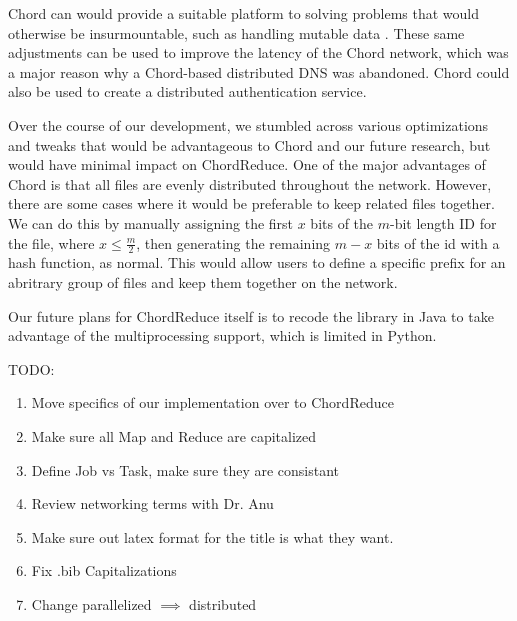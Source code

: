 \documentclass[conference, compsocconf, letterpaper]{IEEEtran}
\begin{document}
Chord can would provide a suitable platform to solving problems that would otherwise be insurmountable, such as handling mutable data \cite{IRM}.  These same adjustments can be used to improve the latency of the Chord network, which was a major reason why a Chord-based distributed DNS \cite{cox2002serving} was abandoned.  Chord could also be used to create a distributed authentication service.

Over the course of our development, we stumbled across various optimizations and tweaks that would be advantageous to Chord and our future research, but would have minimal impact on ChordReduce.  One of the major advantages of Chord is that all files are evenly distributed throughout the network.  However, there are some cases where it would be preferable to keep related files together.  We can do this by manually assigning the first $x$ bits of the $m$-bit length ID for the file, where $x \leq \frac{m}{2}$, then generating the remaining $m-x$ bits of the id with a hash function, as normal.  This would allow users to define a specific prefix for an abritrary group of files and keep them together on the network.


Our future plans for ChordReduce itself is to recode the library in Java to take advantage of the multiprocessing support, which is limited in Python. 

TODO:
\begin{enumerate}
    \item Move specifics of our implementation over to ChordReduce
    \item Make sure all Map and Reduce are capitalized
    \item Define Job vs Task, make sure they are consistant
    \item Review networking terms with Dr. Anu
    \item Make sure out latex format for the title is what they want.
    \item Fix .bib Capitalizations
    \item Change parallelized  $\implies$ distributed
\end{enumerate}





\end{document}
